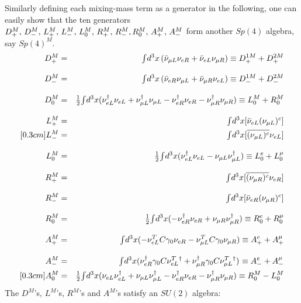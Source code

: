 \documentclass[a4paper,12pt]{article}
\begin{document}
Similarly defining each mixing-mass term as a generator in the following, 
one can easily show that the ten generators $D_{+}^{M},\,D_{-}^{M},\,L_{+}^{M}
,\,L_{-}^{M},\,L_{0}^{M},\,R_{+}^{M},\,R_{-}^{M},\\R_{0}^{M},\,A_{+}^{M},\,A_{-}^{M}$ form another $Sp(4)$ algebra, say $Sp(4)^M$.
\begin{eqnarray}
D_{+}^{M}&=&{\textstyle \int} d^{3}{x}\left( \bar{\nu}_{\mu L}\nu _{eR}+\bar{\nu}_{eL}\nu
_{\mu R}\right) \equiv D_{+}^{1M}+D_{+}^{2M} \nonumber \\[0.3cm]
D_{-}^{M}&=&{\textstyle \int} d^{3}{x}\left( \bar{\nu}_{eR}\nu _{\mu L}+\bar{\nu}_{\mu
R}\nu _{eL}\right) \equiv D_{-}^{1M}+D_{-}^{2M} \nonumber \\[0.3cm]
D_{0}^{M}&=&{\textstyle\frac{1}{2}}{\textstyle \int} d^{3}{x}(\nu _{eL}^{\dagger }\nu _{eL}+\nu _{\mu
L}^{\dagger }\nu _{\mu L}-\nu _{eR}^{\dagger }\nu _{eR}-\nu _{\mu
R}^{\dagger }\nu _{\mu R})\equiv L_{0}^{M}+R_{0}^{M} \nonumber \\[0.3cm]
L_{+}^{M}&=&{\textstyle \int} d^{3}{x[}\bar{\nu}_{eL}(\nu _{\mu L}{})^{c}] \nonumber \\
[0.3cm]
L_{-}^{M}&=&{\textstyle \int} d^{3}{x[}\overline{(\nu _{\mu L}{})^{c}}\nu _{eL}{}] 
\nonumber \\[0.3cm]
L_{0}^{M}&=&{\textstyle\frac{1}{2}}{\textstyle \int} d^{3}{x}(\nu _{eL}^{\dagger }\nu _{eL}-\nu _{\mu
L}\nu _{\mu L}^{\dagger })\equiv L_{0}^{e}+L_{0}^{\mu } \\[0.3cm]
R_{+}^{M}&=&{\textstyle \int} d^{3}{x[}\overline{(\nu _{\mu R}{})^{c}}\nu _{eR}{}] 
\nonumber \\[0.3cm]
R_{-}^{M}&=&{\textstyle \int} d^{3}{x[}\bar{\nu}_{eR}(\nu _{\mu R}{})^{c}] \nonumber \\[8pt]
R_{0}^{M}&=&{\textstyle\frac{1}{2}}{\textstyle \int} d^{3}{x}(-\nu _{eR}^{\dagger }\nu _{eR}+\nu _{\mu
R}\nu _{\mu R}^{\dagger })\equiv R_{0}^{e}+R_{0}^{\mu } \nonumber \\[0.3cm]
A_{+}^{M}&=&{\textstyle \int} d^{3}{x}(-\nu _{eL}^{T}C\gamma _{0}\nu _{eR}-\nu _{\mu
L}^{T}C\gamma _{0}\nu _{\mu R})\equiv A_{+}^{e}+A_{+}^{\mu } \nonumber 
\\[0.3cm]
A_{-}^{M}&=&{\textstyle \int} d^{3}{x(}\nu _{eR}^{\dagger }\gamma _{0}C\nu
_{eL}^{T}{}^{\dagger }+\nu _{\mu R}^{\dagger }\gamma _{0}C\nu _{\mu
L}^{T}{}^{\dagger })^{{}}\equiv A_{-}^{e}+A_{-}^{\mu } \nonumber \\ [0.3cm]
A_{0}^{M}&=&{\textstyle\frac{1}{2}}{\textstyle \int} d^{3}{x}(\nu _{eL}\nu _{eL}^{\dagger }+\nu _{\mu
L}\nu _{\mu L}^{\dagger }-\nu _{eR}^{\dagger }\nu _{eR}-\nu _{\mu
R}^{\dagger }\nu _{\mu R})\equiv R_{0}^{M}-L_{0}^{M} \nonumber
\end{eqnarray}
The $D^M$'s, $L^M$'s, $R^M$'s and $A^M$'s  satisfy an $SU(2)$ algebra: 
\end{document}
